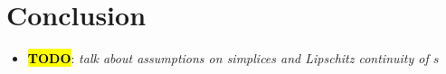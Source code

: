 \documentclass[eikonal.tex]{subfiles}
\begin{document}
\section{Conclusion}

\begin{itemize}
\item  \hl{\textbf{TODO}}: \emph{talk about assumptions on simplices and
    Lipschitz continuity of $s$}
\end{itemize}
\end{document}
